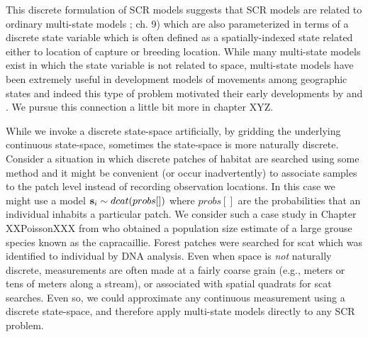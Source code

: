 This discrete formulation of SCR models suggests that SCR models are
related to ordinary multi-state models \citep{kery_schaub:2011};
ch. 9) which are also parameterized in terms of a discrete state
variable which is often defined as a spatially-indexed state related
either to location of capture or breeding location. While many
multi-state models exist in which the state variable is not related to
space, multi-state models have been extremely useful in development
models of movements among geographic states and indeed this type of
problem motivated their early developments by \citet{arnason:1973,
  arnason:1974} and \citet{hestbeck_etal:1991}.  We pursue this
connection a little bit more in chapter XYZ. 

While we invoke a discrete state-space artificially, by gridding the
underlying continuous state-space, sometimes the state-space is more
naturally discrete. Consider a situation in which discrete patches of
habitat are searched using some method and it might be convenient (or
occur inadvertently) to associate samples to the patch level instead
of recording observation locations. In this case we might use a model
${\bf s}_{i} \sim dcat(probs[])$  where $probs[]$ are the probabilities that
an individual inhabits a particular patch. We consider such a case
study in Chapter XXPoissonXXX from \citet{mollet_etal:2012} who
obtained a population size estimate of a large grouse species known as
the capracaillie. Forest patches were searched for scat which was
identified to individual by DNA analysis. Even when space is {\it not}
naturally discrete, measurements are often made at a fairly coarse
grain (e.g., meters or tens of meters along a stream), or associated
with spatial quadrats for scat searches. Even so, we could approximate
any continuous measurement using a discrete state-space, and therefore
apply multi-state models directly to any SCR problem. 


